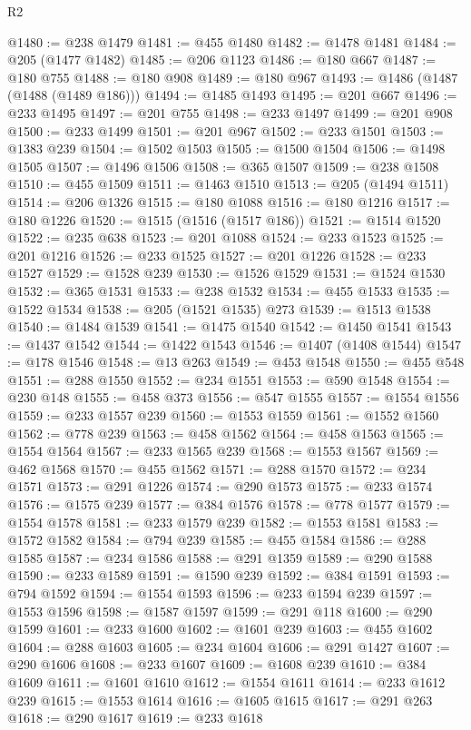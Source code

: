 \begin{lexlean}{R2}
\begin{coremodule}
@1480 := @238 @1479
@1481 := @455 @1480
@1482 := @1478 @1481
@1484 := @205 (@1477 @1482)
@1485 := @206 @1123
@1486 := @180 @667
@1487 := @180 @755
@1488 := @180 @908
@1489 := @180 @967
@1493 := @1486 (@1487 (@1488 (@1489 @186)))
@1494 := @1485 @1493
@1495 := @201 @667
@1496 := @233 @1495
@1497 := @201 @755
@1498 := @233 @1497
@1499 := @201 @908
@1500 := @233 @1499
@1501 := @201 @967
@1502 := @233 @1501
@1503 := @1383 @239
@1504 := @1502 @1503
@1505 := @1500 @1504
@1506 := @1498 @1505
@1507 := @1496 @1506
@1508 := @365 @1507
@1509 := @238 @1508
@1510 := @455 @1509
@1511 := @1463 @1510
@1513 := @205 (@1494 @1511)
@1514 := @206 @1326
@1515 := @180 @1088
@1516 := @180 @1216
@1517 := @180 @1226
@1520 := @1515 (@1516 (@1517 @186))
@1521 := @1514 @1520
@1522 := @235 @638
@1523 := @201 @1088
@1524 := @233 @1523
@1525 := @201 @1216
@1526 := @233 @1525
@1527 := @201 @1226
@1528 := @233 @1527
@1529 := @1528 @239
@1530 := @1526 @1529
@1531 := @1524 @1530
@1532 := @365 @1531
@1533 := @238 @1532
@1534 := @455 @1533
@1535 := @1522 @1534
@1538 := @205 (@1521 @1535) @273
@1539 := @1513 @1538
@1540 := @1484 @1539
@1541 := @1475 @1540
@1542 := @1450 @1541
@1543 := @1437 @1542
@1544 := @1422 @1543
@1546 := @1407 (@1408 @1544)
@1547 := @178 @1546
@1548 := @13 @263
@1549 := @453 @1548
@1550 := @455 @548
@1551 := @288 @1550
@1552 := @234 @1551
@1553 := @590 @1548
@1554 := @230 @148
@1555 := @458 @373
@1556 := @547 @1555
@1557 := @1554 @1556
@1559 := @233 @1557 @239
@1560 := @1553 @1559
@1561 := @1552 @1560
@1562 := @778 @239
@1563 := @458 @1562
@1564 := @458 @1563
@1565 := @1554 @1564
@1567 := @233 @1565 @239
@1568 := @1553 @1567
@1569 := @462 @1568
@1570 := @455 @1562
@1571 := @288 @1570
@1572 := @234 @1571
@1573 := @291 @1226
@1574 := @290 @1573
@1575 := @233 @1574
@1576 := @1575 @239
@1577 := @384 @1576
@1578 := @778 @1577
@1579 := @1554 @1578
@1581 := @233 @1579 @239
@1582 := @1553 @1581
@1583 := @1572 @1582
@1584 := @794 @239
@1585 := @455 @1584
@1586 := @288 @1585
@1587 := @234 @1586
@1588 := @291 @1359
@1589 := @290 @1588
@1590 := @233 @1589
@1591 := @1590 @239
@1592 := @384 @1591
@1593 := @794 @1592
@1594 := @1554 @1593
@1596 := @233 @1594 @239
@1597 := @1553 @1596
@1598 := @1587 @1597
@1599 := @291 @118
@1600 := @290 @1599
@1601 := @233 @1600
@1602 := @1601 @239
@1603 := @455 @1602
@1604 := @288 @1603
@1605 := @234 @1604
@1606 := @291 @1427
@1607 := @290 @1606
@1608 := @233 @1607
@1609 := @1608 @239
@1610 := @384 @1609
@1611 := @1601 @1610
@1612 := @1554 @1611
@1614 := @233 @1612 @239
@1615 := @1553 @1614
@1616 := @1605 @1615
@1617 := @291 @263
@1618 := @290 @1617
@1619 := @233 @1618

\end{coremodule}
\end{lexlean}
